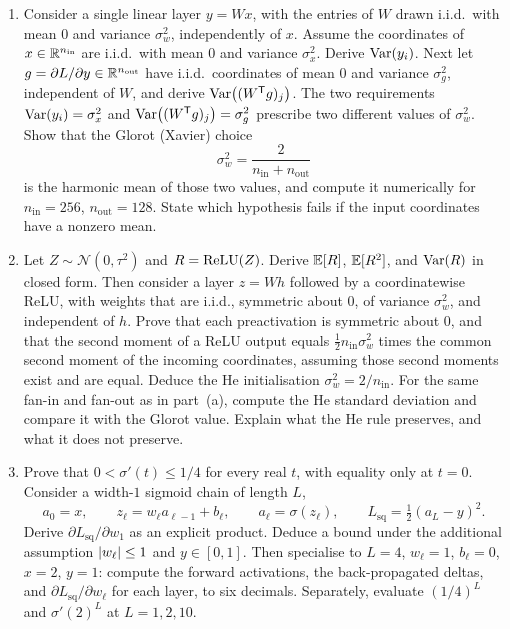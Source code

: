 \begin{enumerate}[label=\textbf{(\alph*)}]
  \item Consider a single linear layer \(y = Wx\), with the entries of \(W\) drawn i.i.d.\ with mean \(0\) and variance \(\sigma_w^2\), independently of \(x\). Assume the coordinates of \(x\in\mathbb{R}^{n_{\mathrm{in}}}\) are i.i.d.\ with mean \(0\) and variance \(\sigma_x^2\). Derive \(\operatorname{Var}(y_i)\). Next let \(g=\partial L/\partial y\in\mathbb{R}^{n_{\mathrm{out}}}\) have i.i.d.\ coordinates of mean \(0\) and variance \(\sigma_g^2\), independent of \(W\), and derive \(\operatorname{Var}\bigl((W^{\mathsf{T}} g)_j\bigr)\). The two requirements \(\operatorname{Var}(y_i)=\sigma_x^2\) and \(\operatorname{Var}\bigl((W^{\mathsf{T}} g)_j\bigr)=\sigma_g^2\) prescribe two different values of \(\sigma_w^2\). Show that the Glorot (Xavier) choice
  \[
    \sigma_w^2 = \frac{2}{n_{\mathrm{in}}+n_{\mathrm{out}}}
  \]
  is the harmonic mean of those two values, and compute it numerically for \(n_{\mathrm{in}}=256\), \(n_{\mathrm{out}}=128\). State which hypothesis fails if the input coordinates have a nonzero mean.

  \item Let \(Z\sim\mathcal N(0,\tau^2)\) and \(R=\operatorname{ReLU}(Z)\). Derive \(\mathbb{E}[R]\), \(\mathbb{E}[R^2]\), and \(\operatorname{Var}(R)\) in closed form. Then consider a layer \(z = Wh\) followed by a coordinatewise ReLU, with weights that are i.i.d., symmetric about \(0\), of variance \(\sigma_w^2\), and independent of \(h\). Prove that each preactivation is symmetric about \(0\), and that the second moment of a ReLU output equals \(\tfrac12 n_{\mathrm{in}}\sigma_w^2\) times the common second moment of the incoming coordinates, assuming those second moments exist and are equal. Deduce the He initialisation \(\sigma_w^2 = 2/n_{\mathrm{in}}\). For the same fan-in and fan-out as in part~(a), compute the He standard deviation and compare it with the Glorot value. Explain what the He rule preserves, and what it does not preserve.

  \item Prove that \(0 < \sigma'(t) \le 1/4\) for every real \(t\), with equality only at \(t=0\). Consider a width-\(1\) sigmoid chain of length \(L\),
  \[
    a_0 = x,
    \qquad
    z_\ell = w_\ell a_{\ell-1} + b_\ell,
    \qquad
    a_\ell = \sigma(z_\ell),
    \qquad
    L_{\mathrm{sq}} = \tfrac12(a_L-y)^2.
  \]
  Derive \(\partial L_{\mathrm{sq}}/\partial w_1\) as an explicit product. Deduce a bound under the additional assumption \(\lvert w_\ell\rvert\le 1\) and \(y\in[0,1]\). Then specialise to \(L=4\), \(w_\ell=1\), \(b_\ell=0\), \(x=2\), \(y=1\): compute the forward activations, the back-propagated deltas, and \(\partial L_{\mathrm{sq}}/\partial w_\ell\) for each layer, to six decimals. Separately, evaluate \((1/4)^L\) and \(\sigma'(2)^L\) at \(L=1,2,10\).


\end{enumerate}
